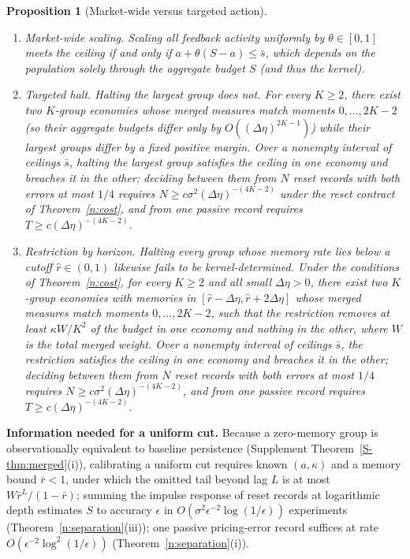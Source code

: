 \documentclass[11pt,letterpaper]{article}
\newtheorem{proposition}[theorem]{Proposition}
\theoremstyle{definition}
\begin{document}
\begin{proposition}[Market-wide versus targeted action]\label{n:target}
\begin{enumerate}
  \item[(i)] \emph{Market-wide scaling.} Scaling all feedback activity uniformly by $\theta \in [0, 1]$ meets the ceiling if and only if $a + \theta(S - a) \le \bar{s}$, which depends on the population solely through the aggregate budget $S$ (and thus the kernel).
  \item[(ii)] \emph{Targeted halt.} Halting the largest group does not. For every $K \ge 2$, there exist two $K$-group economies whose merged measures match moments $0, \dots, 2K-2$ (so their aggregate budgets differ only by $O((\Delta\eta)^{2K-1})$) while their largest groups differ by a fixed positive margin. Over a nonempty interval of ceilings $\bar{s}$, halting the largest group satisfies the ceiling in one economy and breaches it in the other; deciding between them from $N$ reset records with both errors at most $1/4$ requires $N \ge c \sigma^2 (\Delta\eta)^{-(4K-2)}$ under the reset contract of Theorem~\ref{n:cost}, and from one passive record requires $T \ge c (\Delta\eta)^{-(4K-2)}$.
  \item[(iii)] \emph{Restriction by horizon.} Halting every group whose memory rate lies below a cutoff $\hat r \in (0, 1)$ likewise fails to be kernel-determined. Under the conditions of Theorem~\ref{n:cost}, for every $K \ge 2$ and all small $\Delta\eta > 0$, there exist two $K$-group economies with memories in $[\hat r - \Delta\eta, \hat r + 2\Delta\eta]$ whose merged measures match moments $0, \dots, 2K-2$, such that the restriction removes at least $\kappa W/K^2$ of the budget in one economy and nothing in the other, where $W$ is the total merged weight. Over a nonempty interval of ceilings $\bar{s}$, the restriction satisfies the ceiling in one economy and breaches it in the other; deciding between them from $N$ reset records with both errors at most $1/4$ requires $N \ge c \sigma^2 (\Delta\eta)^{-(4K-2)}$, and from one passive record requires $T \ge c (\Delta\eta)^{-(4K-2)}$.
\end{enumerate}
\end{proposition}

\textbf{Information needed for a uniform cut.} Because a zero-memory group is observationally equivalent to baseline persistence (Supplement Theorem~\ref{S-thm:merged}(i)), calibrating a uniform cut requires known $(a,\kappa)$ and a memory bound $\bar r<1$, under which the omitted tail beyond lag $L$ is at most $W\bar r^L/(1-\bar r)$; summing the impulse response of reset records at logarithmic depth estimates $S$ to accuracy $\epsilon$ in $O(\sigma^2\epsilon^{-2}\log(1/\epsilon))$ experiments (Theorem~\ref{n:separation}(iii)); one passive pricing-error record suffices at rate $O(\epsilon^{-2}\log^2(1/\epsilon))$ (Theorem~\ref{n:separation}(i)).
\end{document}
